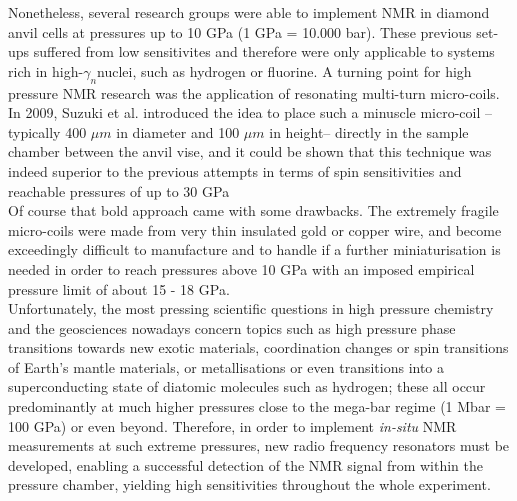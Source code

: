 \documentclass[aip,rsi,reprint,graphicx]{revtex4-1} %
\begin{document}
Nonetheless, several research groups were able to implement NMR in diamond anvil cells at pressures up to 10 GPa (1 GPa = 10.000 bar)\cite{Meier2017}. These previous set-ups suffered from low sensitivites and therefore were only applicable to systems rich in \grqq high-$\gamma_n$\grqq nuclei, such as hydrogen or fluorine. A turning point for high pressure NMR research was the application of resonating multi-turn micro-coils. In 2009, Suzuki et al. introduced the idea to place such a minuscle micro-coil \---typically 400 $\mu m$ in diameter and 100 $\mu m$ in height\--- directly in the sample chamber between the anvil vise\cite{Suzuki2009}, and it could be shown that this technique was indeed superior to the previous attempts in terms of spin sensitivities\cite{Meier2014, Meier2015} and reachable pressures of up to 30 GPa\cite{Meier2015a}\\
Of course that bold approach came with some drawbacks. The extremely fragile micro-coils were made from very thin insulated gold or copper wire, and become exceedingly difficult to manufacture and to handle if a further miniaturisation is needed in order to reach pressures above 10 GPa\cite{Meier2014a} with an imposed empirical pressure limit of about 15 \-- 18 GPa.\\
Unfortunately, the most pressing scientific questions in high pressure chemistry and the geosciences nowadays concern topics such as high pressure phase transitions towards new exotic materials\cite{Schwarz1999, Bykova2016}, coordination changes or spin transitions of Earth's mantle materials\cite{Frost2004, Kupenko2015a, Kurnosov2017}, or metallisations or even transitions into a superconducting state of diatomic molecules such as hydrogen\cite{Eremets2011, Eremets2016, Dalladay-Simpson2016, Dias2017}; these all occur predominantly at much higher pressures close to the mega-bar regime (1 Mbar = 100 GPa) or even beyond. Therefore, in order to implement \textit{in-situ} NMR measurements at such extreme pressures, new radio frequency resonators must be developed, enabling a successful detection of the NMR signal from within the pressure chamber, yielding high sensitivities throughout the whole experiment.\\
\end{document}

